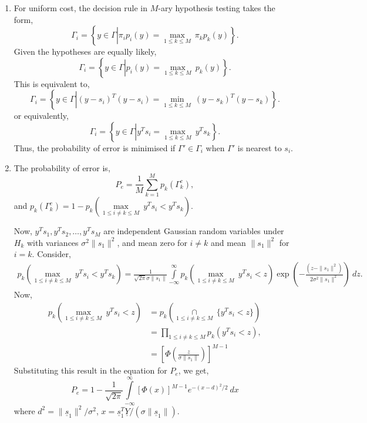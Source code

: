 \documentclass[a4paper,english,12pt]{article}
\newcommand{\ubar}[1]{\underline{#1}}
\begin{document}
\begin{enumerate}[label=(\alph*).]
\item For uniform cost, the decision rule in $M$-ary hypothesis testing takes the form,
\begin{equation*}
\Gamma_i=\left\lbrace y\in \Gamma \left|  \pi_i p_i(y)= \underset{1\leq k \leq M}{\max}~\pi_k p_k(y)\right.\right\rbrace.
\end{equation*}
Given the hypotheses are equally likely, 
\begin{equation*}
\Gamma_i=\left\lbrace y\in \Gamma \left|  p_i(y)= \underset{1\leq k \leq M}{\max}~p_k(y)\right.\right\rbrace.
\end{equation*}
This is equivalent to,
\begin{equation*}
\Gamma_i=\left\lbrace y\in \Gamma \left|  (y-s_{i})^T(y-s_{i})= \underset{1\leq k \leq M}{\min}~(y-s_{k})^T(y-s_{k})\right.\right\rbrace.
\end{equation*}
or equivalently,
\begin{equation*}
\Gamma_i=\left\lbrace y\in \Gamma \left|  y^Ts_{i}= \underset{1\leq k \leq M}{\max}~y^Ts_{k}\right.\right\rbrace.
\end{equation*}
Thus, the probability of error is minimised if $\Gamma' \in \Gamma_{i} $ when $\Gamma'$ is nearest to $s_{i}$.
\item The probability of error is,
\begin{equation*}
P_e=\frac{1}{M}\sum\limits_{k=1}^{M}p_k(\Gamma_k^c),
\end{equation*}
and $p_k(\Gamma_k^c)=1-p_k\left(\underset{1\leq i\neq k \leq M}{\max}~y^Ts_{i}< y^Ts_{k}\right)$.
\par Now, $y^Ts_{1},y^Ts_{2},\dots,y^Ts_{M}$ are independent Gaussian random variables under $H_k$ with variances $\sigma^2\|s_1\|^2$, and mean zero for $i\neq k$ and mean $\|s_1\|^2$ for $i=k$. Consider,
\begin{align*}
p_k\left(\underset{1\leq i\neq k \leq M}{\max}~y^Ts_{i}< y^Ts_{k}\right)=\frac{1}{\sqrt{2\pi}\sigma\|s_1\|}\int\limits_{-\infty}^{\infty} p_k\left(\underset{1\leq i\neq k \leq M}{\max}~y^Ts_{i}< z\right)\exp\left(-\frac{(z-\|s_1\|^2)}{2\sigma^2 \|s_1\|^2}\right)~dz.
\end{align*}
Now,
\begin{align*}
p_k\left(\underset{1\leq i\neq k \leq M}{\max}~y^Ts_{i}< z\right)&=p_k\left( \underset{1\leq i\neq k \leq M}{\cap}~\{y^Ts_{i}< z\}\right)\\
&=\prod\limits_{1\leq i\neq k \leq M} p_k\left( y^Ts_{i}< z\right),\\
&=\left[ \Phi\left(\frac{z}{\sigma \|s_1\|} \right)\right]^{M-1}
\end{align*}
Substituting this result in the equation for $P_e$, we get,
\begin{equation*}
P_e=1-\frac{1}{\sqrt{2\pi}}\int\limits_{-\infty}^{\infty} \left[\Phi(x)\right]^{M-1}e^{-(x-d)^2/2}~dx
\end{equation*}
where $d^2=\|\ubar{s}_1\|^2/\sigma^2$, $x=\ubar{s}_1^T\ubar{Y}/(\sigma \|\ubar{s}_1\|)$.
\end{enumerate}
\end{document}
